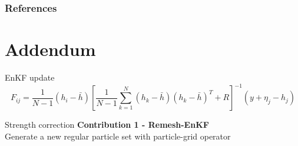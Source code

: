 \documentclass[aspectratio=169]{beamer} %
\begin{document}
\begin{frame}
    \frametitle{References}
    \printbibliography %
\end{frame}

\section*{Addendum}
\begin{frame}{EnKF update}
    \begin{equation*}
        F_{ij} = \frac{1}{N-1}(h_i - \bar h)\left[\frac{1}{N-1} \sum_{k=1}^N (h_k - \bar h)(h_k - \bar h)^T + R\right]^{-1} (y + \eta_j - h_j)
    \end{equation*}
\end{frame}

\begin{frame}{Strength correction}
    \small
    \textbf{Contribution 1 - Remesh-EnKF} \\

    Generate a new regular particle set with particle-grid operator \\


\end{frame}
\end{document}
